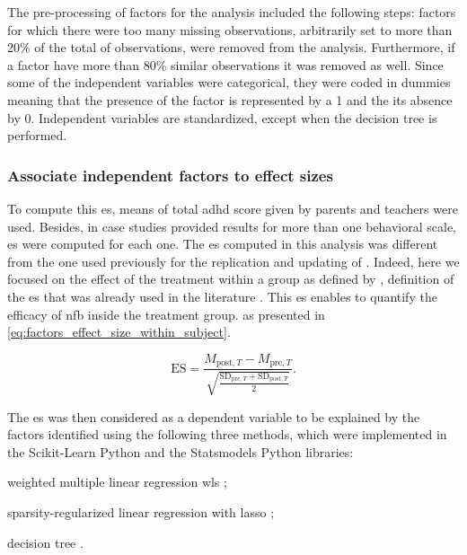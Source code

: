 The pre-processing of factors for the analysis included the following steps: factors for which there were too many missing observations, 
arbitrarily set to more than 20\% of the total of observations, were removed from the analysis. Furthermore, if a factor have more than 
80\% similar observations it was removed as well. Since some of the independent variables were categorical, they were coded in dummies
meaning that the presence of the factor is represented by a 1 and the its absence by 0. Independent variables are standardized, 
except when the decision tree is performed. 

\subsubsection{Associate independent factors to effect sizes}

To compute this \gls{es}, means of total \gls{adhd} score given by parents and teachers were used. Besides, in case studies provided results 
for more than one behavioral scale, \gls{es} were computed for each one. The \gls{es} computed in this analysis was different from the one 
used previously for the replication and updating of \citet{Cortese2016}. Indeed, here we focused on the effect of the treatment within 
a group as defined by \citet{Cohen1988}, definition of the \gls{es} that was already used in the literature \citep{Arns2009, Maurizio2014, 
Strehl2017}. This \gls{es} enables to quantify the efficacy of \gls{nfb} inside the treatment group. as presented in \cref{eq:factors_effect_size_within_subject}.

\begin{equation}
\label{eq:factors_effect_size_within_subject}
\text{ES} = \frac{M_{\text{post},T} - M_{\text{pre},T}}  { \sqrt{ \frac{\text{SD}_{\text{pre},T} + \text{SD}_{\text{post},T}} {2} } }.
\end{equation} 

The \gls{es} was then considered as a dependent variable to be explained by the factors identified using the following three methods, which were 
implemented in the Scikit-Learn Python \citep{Pedregosa2011} and the Statsmodels Python\citep{Seabold2010} libraries:
\begin{description}
	\item weighted multiple linear regression \gls{wls} \citep{Montgomery2012}; 
	\item sparsity-regularized linear regression with \gls{lasso} \citep{Tibshirani1996};
	\item decision tree \citep{Quinlan1986}.
\end{description}

